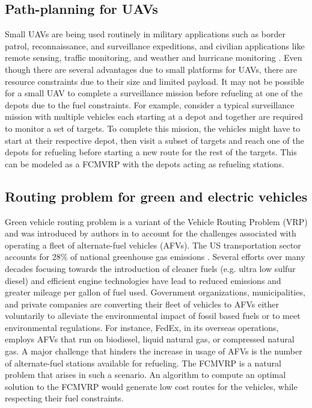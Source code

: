 \documentclass[letterpaper, 10pt, conference]{ieeeconf}
\begin{document}
\subsection{Path-planning for UAVs \label{subsec:introuav}}
Small UAVs are being used routinely in military applications such as border patrol, reconnaissance, and surveillance expeditions, and civilian applications like remote sensing, traffic monitoring, and weather and hurricane monitoring \cite{Frew2009, Curry2004, ZajkowskiT2006}. Even though there are several advantages due to small platforms for UAVs, there are resource constraints due to their size and limited payload. It may not be possible for a small UAV to complete a surveillance mission before refueling at one of the depots due to the fuel constraints. For example, consider a typical surveillance mission with multiple vehicles each starting at a depot and together are required to monitor a set of targets. To complete this mission, the vehicles might have to start at their respective depot, then visit a subset of targets and reach one of the depots for refueling before starting a new route for the rest of the targets. This can be modeled as a FCMVRP with the depots acting as refueling stations. 

\subsection{Routing problem for green  and electric vehicles \label{subsec:introgvrp}}
Green vehicle routing problem is a variant of the Vehicle Routing Problem (VRP) and was introduced by authors in \cite{Erdougan2012} to account for the challenges associated with operating a fleet of alternate-fuel vehicles (AFVs). The US transportation sector accounts for 28\% of national greenhouse gas emissions \cite{USEPA}. Several efforts over many decades focusing towards the introduction of cleaner fuels (e.g. ultra low sulfur diesel) and efficient engine technologies have lead to reduced emissions and greater mileage per gallon of fuel used. Government organizations, municipalities, and private companies are converting their fleet of vehicles to AFVs either voluntarily to alleviate the environmental impact of fossil based fuels or to meet environmental regulations. For instance, FedEx, in its overseas operations, employs AFVs that run on biodiesel, liquid natural gas, or compressed natural gas. A major challenge that hinders the increase in usage of AFVs is the number of alternate-fuel stations available for refueling. The FCMVRP is a natural problem that arises in such a scenario. An algorithm to compute an optimal solution to the FCMVRP would generate low cost routes for the vehicles, while respecting their fuel constraints. 
\end{document}
